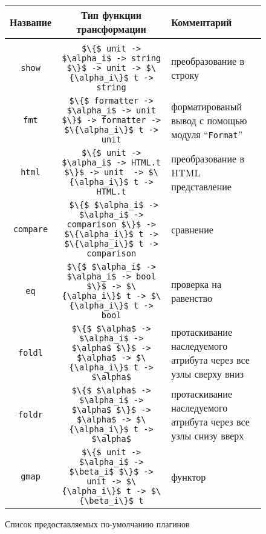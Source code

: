 \begin{figure}[t]
  \center
  \small
  \begin{tabular}{ccp{4cm}}
    Название & Тип функции трансформации & Комментарий \\[3mm]
    \hline\\
    \lstinline|show| & \lstinline|$\{$ unit -> $\alpha_i$ -> string $\}$ -> unit -> $\{\alpha_i\}$ t -> string| & преобразование в строку\\[2mm]
    \lstinline|fmt| & \lstinline|$\{$ formatter -> $\alpha_i$ -> unit $\}$ -> formatter -> $\{\alpha_i\}$ t -> unit| & форматированый вывод с помощью модуля ``\lstinline|Format|'' \\[2mm]
    \lstinline|html| & \lstinline|$\{$ unit -> $\alpha_i$ -> HTML.t $\}$ -> unit  -> $\{\alpha_i\}$ t -> HTML.t| & преобразование в HTML представление \\[2mm]
    \lstinline|compare| & \lstinline| $\{$ $\alpha_i$ -> $\alpha_i$ -> comparison $\}$ -> $\{\alpha_i\}$ t -> $\{\alpha_i\}$ t -> comparison| & сравнение \\[2mm]
    \lstinline|eq| & \lstinline|$\{$ $\alpha_i$ -> $\alpha_i$ -> bool $\}$ -> $\{\alpha_i\}$ t -> $\{\alpha_i\}$ t -> bool| & проверка на равенство \\[2mm]
    \lstinline|foldl| & \lstinline |$\{$ $\alpha$ -> $\alpha_i$ -> $\alpha$ $\}$ -> $\alpha$ -> $\{\alpha_i\}$ t -> $\alpha$| & протаскивание наследуемого атрибута через все узлы сверху вниз \\[2mm]
    \lstinline|foldr| & \lstinline |$\{$ $\alpha$ -> $\alpha_i$ -> $\alpha$ $\}$ -> $\alpha$ -> $\{\alpha_i\}$ t -> $\alpha$| & протаскивание наследуемого атрибута через все узлы снизу вверх \\[2mm]
    \lstinline|gmap| & \lstinline|$\{$ unit -> $\alpha_i$ -> $\beta_i$ $\}$ -> unit -> $\{\alpha_i\}$ t -> $\{\beta_i\}$ t| & функтор %
  \end{tabular}
  \caption{Список предоставляемых по-умолчанию плагинов}
  \label{listofplugins}
\end{figure}


